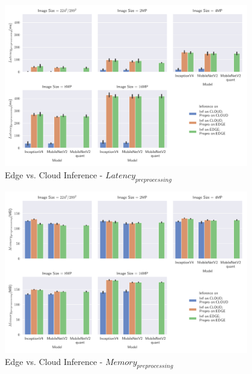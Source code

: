 \begin{figure}[H]
\centering
\includegraphics[width=0.95\textwidth]{./Bilder/single_plots/edge_vs_cloud_plots/Edge_vs_Cloud_Inference_Preprocessing_Latencies.pdf}
\caption{Edge vs. Cloud Inference -  $Latency_{preprocessing}$}
\label{fig:EdgeVsCloudPreproLat}
\end{figure}
\begin{figure}[H]
\centering
\includegraphics[width=0.95\textwidth]{./Bilder/single_plots/edge_vs_cloud_plots/Edge_vs_Cloud_Inference_Preprocessing_Memory.pdf}
\caption{Edge vs. Cloud Inference -  $Memory_{preprocessing}$}
\label{fig:EdgeVsCloudPreproMemory}
\end{figure}

